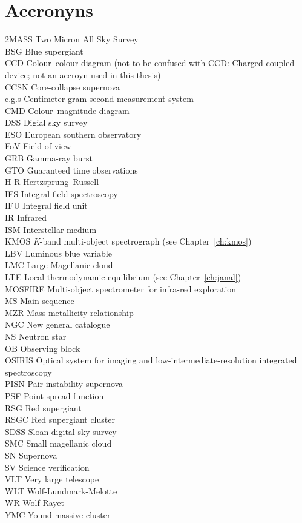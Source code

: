 \chapter{Accronyns}\label{ch:acc}
2MASS Two Micron All Sky Survey\\
BSG Blue supergiant\\
CCD Colour--colour diagram (not to be confused with CCD: Charged coupled device; not an accroyn used in this thesis)\\
CCSN Core-collapse supernova\\
c.g.s Centimeter-gram-second measurement system\\
CMD Colour--magnitude diagram\\
DSS Digial sky survey\\
ESO European southern observatory\\
FoV Field of view\\
GRB Gamma-ray burst\\
GTO Guaranteed time observations\\
H-R Hertzsprung--Russell\\
IFS Integral field spectroscopy\\
IFU Integral field unit\\
IR Infrared\\
ISM Interstellar medium\\
KMOS {\it K}-band multi-object spectrograph (see Chapter~\ref{ch:kmos})\\
LBV Luminous blue variable\\
LMC Large Magellanic cloud\\
LTE Local thermodynamic equilibrium (see Chapter~\ref{ch:janal})\\
MOSFIRE Multi-object spectrometer for infra-red exploration\\
MS Main sequence\\
MZR Mass-metallicity relationship\\
NGC New general catalogue\\
NS Neutron star\\
OB Observing block\\
OSIRIS Optical system for imaging and low-intermediate-resolution integrated spectroscopy\\
PISN Pair instability supernova\\
PSF Point spread function\\
RSG Red supergiant\\
RSGC Red supergiant cluster\\
SDSS Sloan digital sky survey\\
SMC Small magellanic cloud\\
SN Supernova\\
SV Science verification\\
VLT Very large telescope\\
WLT Wolf-Lundmark-Melotte\\
WR Wolf-Rayet\\
YMC Yound massive cluster\\
